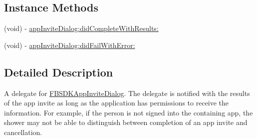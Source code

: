 \subsection*{Instance Methods}
\begin{DoxyCompactItemize}
\item 
(void) -\/ \hyperlink{protocol_f_b_s_d_k_app_invite_dialog_delegate-p_a21c9fc9d58534d6972f310d88e213bf4}{app\-Invite\-Dialog\-:did\-Complete\-With\-Results\-:}
\item 
(void) -\/ \hyperlink{protocol_f_b_s_d_k_app_invite_dialog_delegate-p_a7483f1f58a4cea0a6ddc3b28e37059cd}{app\-Invite\-Dialog\-:did\-Fail\-With\-Error\-:}
\end{DoxyCompactItemize}


\subsection{Detailed Description}
A delegate for \hyperlink{interface_f_b_s_d_k_app_invite_dialog}{F\-B\-S\-D\-K\-App\-Invite\-Dialog}.  The delegate is notified with the results of the app invite as long as the application has permissions to receive the information. For example, if the person is not signed into the containing app, the shower may not be able to distinguish between completion of an app invite and cancellation. 

